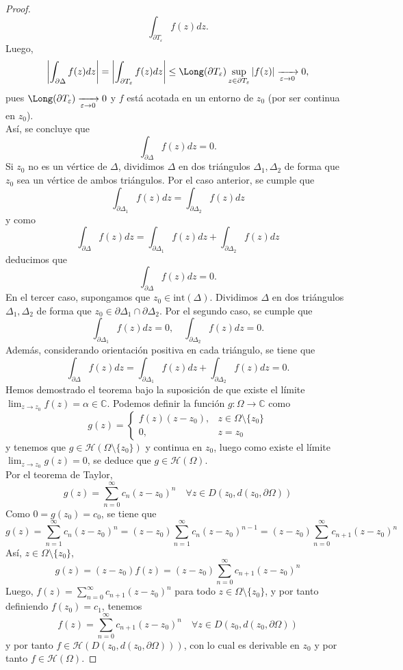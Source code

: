 \begin{proof}
\[        \int_{\partial T_{\varepsilon}} f(z) dz.
    \]
    Luego,
    \[
        \left| \int_{\partial \Delta} f(z) dz \right| =
        \left| \int_{\partial T_{\varepsilon}} f(z) dz \right| \leq
        \Long(\partial T_{\varepsilon}) \sup_{z \in \partial T_{\varepsilon}} |f(z)| \xrightarrow[\varepsilon \to 0]{} 0,
    \]
    pues $\Long(\partial T_{\varepsilon}) \xrightarrow[\varepsilon \to 0]{} 0$ y $f$ está acotada en un entorno de $z_0$ (por ser continua en $z_0$).\\
    Así, se concluye que
    \[
        \int_{\partial \Delta} f(z) dz = 0.
    \]
    Si $z_0$ no es un vértice de $\Delta$, dividimos $\Delta$ en dos triángulos $\Delta_1, \Delta_2$ de forma que $z_0$ sea un vértice de ambos triángulos. Por el caso anterior, se cumple que
    \[
        \int_{\partial \Delta_1} f(z) dz = \int_{\partial \Delta_2} f(z) dz
    \]
    y como 
    \[
        \int_{\partial \Delta} f(z) dz =
        \int_{\partial \Delta_1} f(z) dz +
        \int_{\partial \Delta_2} f(z) dz
    \]
    deducimos que
    \[
        \int_{\partial \Delta} f(z) dz = 0.
    \]
    En el tercer caso, supongamos que $z_0 \in \text{int}(\Delta)$. Dividimos $\Delta$ en dos triángulos $\Delta_1, \Delta_2$ de forma que $z_0 \in \partial \Delta_1 \cap \partial \Delta_2$. Por el segundo caso, se cumple que
    \[
        \int_{\partial \Delta_1} f(z) dz = 0, \quad \int_{\partial \Delta_2} f(z) dz = 0.
    \]
    Además, considerando orientación positiva en cada triángulo, se tiene que
    \[
        \int_{\partial \Delta} f(z) dz =
        \int_{\partial \Delta_1} f(z) dz +
        \int_{\partial \Delta_2} f(z) dz = 0.
    \]
    Hemos demostrado el teorema bajo la suposición de que existe el límite $\lim_{z \to z_0} f(z) = \alpha \in \mathbb{C}$. Podemos definir la función $g : \Omega \to \mathbb{C}$ como
    \[
        g(z) =
        \begin{cases}
            f(z)(z - z_0), & z \in \Omega \setminus \{ z_0 \}\\
            0, & z = z_0
        \end{cases}
    \]
    y tenemos que $g \in \mathcal{H}(\Omega \setminus \{ z_0 \})$ y continua en $z_0$, luego como existe el límite $\lim_{z \to z_0} g(z) = 0$, se deduce que $g \in \mathcal{H}(\Omega)$. \\
    Por el teorema de Taylor,
    \[
        g(z) =
        \sum_{n=0}^{\infty} c_n (z - z_0)^n \quad \forall z \in D(z_0, d(z_0, \partial \Omega))
    \]
    Como $0=g(z_0) = c_0$, se tiene que
    \[
        g(z) = \sum_{n=1}^{\infty} c_n (z - z_0)^n = (z - z_0) \sum_{n=1}^{\infty} c_n (z - z_0)^{n-1} = (z - z_0) \sum_{n=0}^{\infty} c_{n+1} (z - z_0)^n
    \]
    Así, $z \in \Omega \setminus \{ z_0 \}$,
    \[
        g(z) = (z - z_0) f(z) = (z - z_0) \sum_{n=0}^{\infty} c_{n+1} (z - z_0)^n
    \]
    Luego, $f(z) = \sum_{n=0}^{\infty} c_{n+1} (z - z_0)^n$ para todo $z \in \Omega \setminus \{ z_0 \}$, y por tanto definiendo $f(z_0) = c_1$, tenemos
    \[
        f(z) = \sum_{n=0}^{\infty} c_{n+1} (z - z_0)^n \quad \forall z \in D(z_0, d(z_0, \partial \Omega))
    \]
    y por tanto $f \in \mathcal{H}(D(z_0, d(z_0, \partial \Omega)))$, con lo cual es derivable en $z_0$ y por tanto $f \in \mathcal{H}(\Omega)$.
\end{proof}


